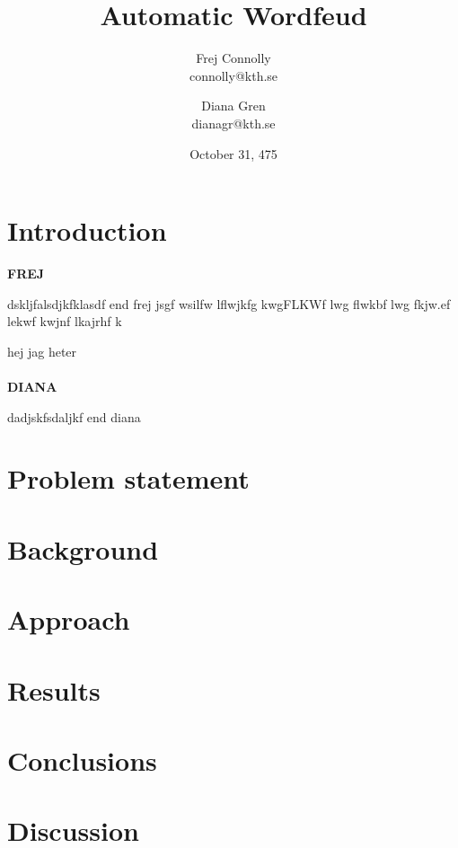 \documentclass[a4paper, 12pt]{report}
\begin{document}
\title{Automatic Wordfeud}
\date{October 31, 475}
\author{Frej Connolly \\ connolly@kth.se
        \and Diana Gren \\ dianagr@kth.se}

\maketitle
\tableofcontents


\chapter{Introduction}
{\bf FREJ}

dskljfalsdjkfklasdf end frej jsgf wsilfw lflwjkfg kwgFLKWf lwg flwkbf lwg fkjw.ef lekwf kwjnf lkajrhf k

hej jag heter
\\\\
{\bf DIANA}

dadjskfsdaljkf
end diana

\chapter{Problem statement}
\chapter{Background}
\chapter{Approach}
\chapter{Results}
\chapter{Conclusions}
\chapter{Discussion}
\end{document}

